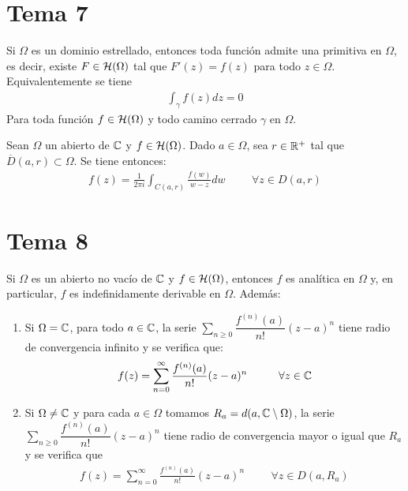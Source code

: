 \documentclass[12pt]{article}
\begin{document}
    \newpage

    \section{Tema 7}

    \begin{teo}
        Si $\Omega$ es un dominio estrellado, entonces toda función admite una primitiva en $\Omega$, es decir, existe $F\in \mathcal{H}(\Omega)$ tal que $F'(z) = f(z)$ para todo $z\in \Omega$. Equivalentemente se tiene
        \begin{gather*}
            \int_\gamma f(z) dz = 0
        \end{gather*}
        Para toda función $f\in \mathcal{H}(\Omega)$ y todo camino cerrado $\gamma$ en $\Omega$.
    \end{teo}

    \begin{prop}
        Sean $\Omega$ un abierto de $\mathbb{C}$ y $f\in \mathcal{H}(\Omega)$. Dado $a\in \Omega$, sea $r\in \mathbb{R}^+$ tal que $\overline{D}(a,r)\subset \Omega$. Se tiene entonces:
        \begin{gather*}
            f(z) = \frac{1}{2\pi i } \int_{C(a,r)} \frac{f(w)}{w-z} dw \hspace{1cm} \forall z \in D(a,r)
        \end{gather*}
    \end{prop}

    \newpage

    \section{Tema 8}
    \begin{teo}
        Si $\Omega$ es un abierto no vacío de $\mathbb{C}$ y $f\in \mathcal{H}(\Omega)$, entonces $f$ es analítica en $\Omega$ y, en particular, $f$ es indefinidamente derivable en $\Omega$. Además:
        \begin{enumerate}
            \item Si $\Omega = \mathbb{C}$, para todo $a\in \mathbb{C}$, la serie $\sum\limits_{n\geq 0} \dfrac{f^{(n)}(a)}{n!}(z-a)^n$ tiene radio de convergencia infinito y se verifica que:
            \begin{gather*}
                f(z) = \sum\limits_{n=0}^\infty \frac{f^{(n)}(a)}{n!} (z-a)^n \hspace{1cm} \forall z \in \mathbb{C}
            \end{gather*}
            \item Si $\Omega \neq \mathbb{C}$ y para cada $a\in \Omega$ tomamos $R_a = d(a,\mathbb{C}\setminus \Omega)$, la serie $\sum\limits_{n\geq 0} \dfrac{f^{(n)}(a)}{n!}(z-a)^n$ tiene radio de convergencia mayor o igual que $R_a$ y se verifica que 
            \begin{gather*}
                f(z) = \sum\limits_{n=0}^\infty \frac{f^{(n)}(a)}{n!} (z-a)^n \hspace{1cm} \forall z \in D(a, R_a)
            \end{gather*}
        \end{enumerate}
    \end{teo}
\end{document}

